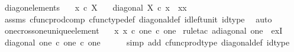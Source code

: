 \begin{isabellebody}
%
\endisatagproof
{\isafoldproof}%
%
\isadelimproof
%
\endisadelimproof
%
\isadelimdocument
%
\endisadelimdocument
%
\isatagdocument
%
\isamarkuptrue%
%
\endisatagdocument
{\isafolddocument}%
%
\isadelimdocument
%
\endisadelimdocument
{}\isamarkupfalse%
\ diag{\isacharunderscore}{\kern0pt}on{\isacharunderscore}{\kern0pt}elements{\isacharcolon}{\kern0pt}\isanewline
\ \ \ {\isachardoublequoteopen}x\ {\isasymin}\isactrlsub c\ X{\isachardoublequoteclose}\isanewline
\ \ \ {\isachardoublequoteopen}diagonal\ X\ {\isasymcirc}\isactrlsub c\ x\ {\isacharequal}{\kern0pt}\ {\isasymlangle}x{\isacharcomma}{\kern0pt}x{\isasymrangle}{\isachardoublequoteclose}\isanewline
%
\isadelimproof
\ \ %
\endisadelimproof
%
\isatagproof
{}\isamarkupfalse%
\ assms\ cfunc{\isacharunderscore}{\kern0pt}prod{\isacharunderscore}{\kern0pt}comp\ cfunc{\isacharunderscore}{\kern0pt}type{\isacharunderscore}{\kern0pt}def\ diagonal{\isacharunderscore}{\kern0pt}def\ id{\isacharunderscore}{\kern0pt}left{\isacharunderscore}{\kern0pt}unit\ id{\isacharunderscore}{\kern0pt}type\ \isamarkupfalse%
\ auto%
\endisatagproof
{\isafoldproof}%
%
\isadelimproof
\isanewline
%
\endisadelimproof
\isanewline
{}\isamarkupfalse%
\ one{\isacharunderscore}{\kern0pt}cross{\isacharunderscore}{\kern0pt}one{\isacharunderscore}{\kern0pt}unique{\isacharunderscore}{\kern0pt}element{\isacharcolon}{\kern0pt}\isanewline
\ \ {\isachardoublequoteopen}{\isasymexists}{\isacharbang}{\kern0pt}\ x{\isachardot}{\kern0pt}\ x\ {\isasymin}\isactrlsub c\ one\ {\isasymtimes}\isactrlsub c\ one{\isachardoublequoteclose}\isanewline
%
\isadelimproof
%
\endisadelimproof
%
\isatagproof
{}\isamarkupfalse%
\ {\isacharparenleft}{\kern0pt}rule{\isacharunderscore}{\kern0pt}tac\ a{\isacharequal}{\kern0pt}{\isachardoublequoteopen}diagonal\ one{\isachardoublequoteclose}\ \ ex{}I{\isacharparenright}{\kern0pt}\isanewline
\ \ \isamarkupfalse%
\ {\isachardoublequoteopen}diagonal\ one\ {\isasymin}\isactrlsub c\ one\ {\isasymtimes}\isactrlsub c\ one{\isachardoublequoteclose}\isanewline
\ \ \ \ \isamarkupfalse%
\ {\isacharparenleft}{\kern0pt}simp\ add{\isacharcolon}{\kern0pt}\ cfunc{\isacharunderscore}{\kern0pt}prod{\isacharunderscore}{\kern0pt}type\ diagonal{\isacharunderscore}{\kern0pt}def\ id{\isacharunderscore}{\kern0pt}type{\isacharparenright}{\kern0pt}\isanewline
{}\isamarkupfalse%
\isanewline

\end{isabellebody}
